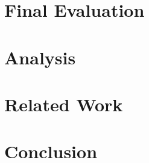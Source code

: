 \documentclass[11pt,letterpaper]{article}
\begin{document}

\section{Final Evaluation}

\section{Analysis}


\section{Related Work}

\section{Conclusion}




\end{document}
